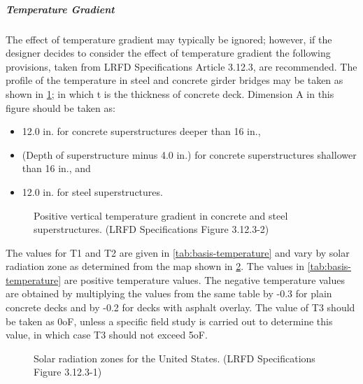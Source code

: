 \subparagraph{Temperature Gradient}
The effect of temperature gradient may typically be ignored; however, if the designer decides to consider the effect of temperature gradient the following provisions, taken from LRFD Specifications Article 3.12.3, are recommended. The profile of the temperature in steel and concrete girder bridges may be taken as shown in \cref{fig:vertical-temperature-gradient}; in which t is the thickness of concrete deck. Dimension A in this figure should be taken as:

\begin{itemize}
  \item 12.0 in. for concrete superstructures deeper than 16 in.,
  \item (Depth of superstructure minus 4.0 in.) for concrete superstructures shallower than 16 in., and
  \item 12.0 in. for steel superstructures.
\end{itemize}

\begin{figure}
  \caption{Positive vertical temperature gradient in concrete and steel superstructures. (LRFD Specifications Figure
  3.12.3-2)}
  \label{fig:vertical-temperature-gradient}
\end{figure}

The values for T1 and T2 are given in \cref{tab:basis-temperature} and vary by solar radiation zone as determined from the map shown in \cref{fig:solar-radiation-zone}. The values in \cref{tab:basis-temperature} are positive temperature values. The negative temperature values are obtained by multiplying the values from the same table by -0.3 for plain concrete decks and by -0.2 for decks with asphalt overlay. The value of T3 should be taken as 0oF, unless a specific field study is carried out to determine this value, in which case T3 should not exceed 5oF.

\begin{table}
  \caption{Basis for Temperature Gradients. (LRFD Specifications Table 3.12.3-1)}
  \label{tab:basis-temperature}
\end{table}

\begin{figure}
  \caption{Solar radiation zones for the United States. (LRFD Specifications Figure 3.12.3-1)}
  \label{fig:solar-radiation-zone}
\end{figure}

